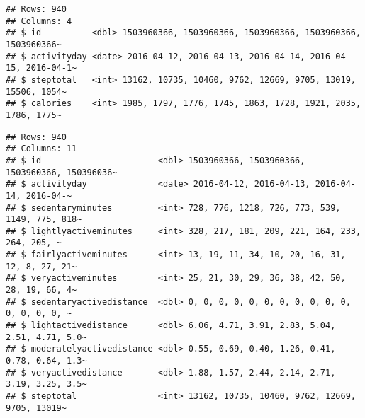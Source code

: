 \documentclass[
]{article}
\newenvironment{Shaded}{\begin{snugshade}}{\end{snugshade}}
\newcommand{\AttributeTok}[1]{\textcolor[rgb]{0.13,0.29,0.53}{#1}}
\newcommand{\FunctionTok}[1]{\textcolor[rgb]{0.13,0.29,0.53}{\textbf{#1}}}
\newcommand{\NormalTok}[1]{#1}
\newcommand{\OtherTok}[1]{\textcolor[rgb]{0.56,0.35,0.01}{#1}}
\newcommand{\SpecialCharTok}[1]{\textcolor[rgb]{0.81,0.36,0.00}{\textbf{#1}}}
\newcommand{\StringTok}[1]{\textcolor[rgb]{0.31,0.60,0.02}{#1}}
\begin{document}
\begin{Shaded}
\end{Shaded}

\begin{verbatim}
## Rows: 940
## Columns: 4
## $ id          <dbl> 1503960366, 1503960366, 1503960366, 1503960366, 1503960366~
## $ activityday <date> 2016-04-12, 2016-04-13, 2016-04-14, 2016-04-15, 2016-04-1~
## $ steptotal   <int> 13162, 10735, 10460, 9762, 12669, 9705, 13019, 15506, 1054~
## $ calories    <int> 1985, 1797, 1776, 1745, 1863, 1728, 1921, 2035, 1786, 1775~
\end{verbatim}

\begin{Shaded}
\end{Shaded}

\begin{verbatim}
## Rows: 940
## Columns: 11
## $ id                       <dbl> 1503960366, 1503960366, 1503960366, 150396036~
## $ activityday              <date> 2016-04-12, 2016-04-13, 2016-04-14, 2016-04-~
## $ sedentaryminutes         <int> 728, 776, 1218, 726, 773, 539, 1149, 775, 818~
## $ lightlyactiveminutes     <int> 328, 217, 181, 209, 221, 164, 233, 264, 205, ~
## $ fairlyactiveminutes      <int> 13, 19, 11, 34, 10, 20, 16, 31, 12, 8, 27, 21~
## $ veryactiveminutes        <int> 25, 21, 30, 29, 36, 38, 42, 50, 28, 19, 66, 4~
## $ sedentaryactivedistance  <dbl> 0, 0, 0, 0, 0, 0, 0, 0, 0, 0, 0, 0, 0, 0, 0, ~
## $ lightactivedistance      <dbl> 6.06, 4.71, 3.91, 2.83, 5.04, 2.51, 4.71, 5.0~
## $ moderatelyactivedistance <dbl> 0.55, 0.69, 0.40, 1.26, 0.41, 0.78, 0.64, 1.3~
## $ veryactivedistance       <dbl> 1.88, 1.57, 2.44, 2.14, 2.71, 3.19, 3.25, 3.5~
## $ steptotal                <int> 13162, 10735, 10460, 9762, 12669, 9705, 13019~
\end{verbatim}
\end{document}
